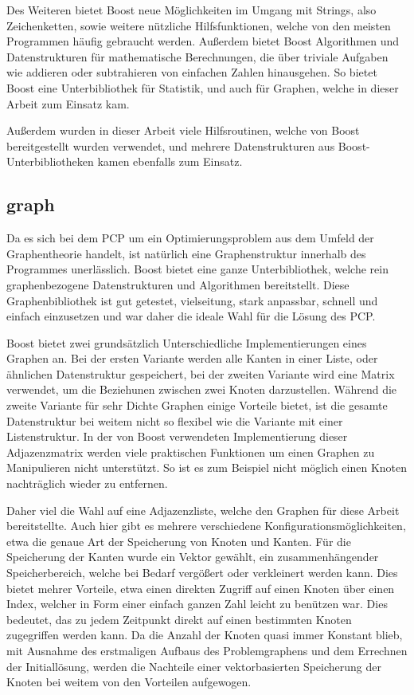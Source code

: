 Des Weiteren bietet Boost neue Möglichkeiten im Umgang mit Strings, also Zeichenketten, sowie weitere nützliche Hilfsfunktionen, welche von den meisten Programmen häufig gebraucht werden. Außerdem bietet
Boost Algorithmen und Datenstrukturen für mathematische Berechnungen, die über triviale Aufgaben wie addieren oder subtrahieren von einfachen Zahlen hinausgehen. So bietet Boost eine Unterbibliothek für 
Statistik, und auch für Graphen, welche in dieser Arbeit zum Einsatz kam.

Außerdem wurden in dieser Arbeit viele Hilfsroutinen, welche von Boost bereitgestellt wurden verwendet, und mehrere Datenstrukturen aus Boost-Unterbibliotheken kamen ebenfalls zum Einsatz.

\subsection{graph}
\label{sec:boost:graph}
Da es sich bei dem PCP um ein Optimierungsproblem aus dem Umfeld der Graphentheorie handelt, ist natürlich eine Graphenstruktur innerhalb des Programmes unerlässlich. Boost bietet eine ganze Unterbibliothek, 
welche rein graphenbezogene Datenstrukturen und Algorithmen bereitstellt. Diese Graphenbibliothek ist gut getestet, vielseitung, stark anpassbar, schnell und einfach einzusetzen und war daher die ideale Wahl
für die Lösung des PCP.

Boost bietet zwei grundsätzlich Unterschiedliche Implementierungen eines Graphen an. Bei der ersten Variante werden alle Kanten in einer Liste, oder ähnlichen Datenstruktur gespeichert, bei
der zweiten Variante wird eine Matrix verwendet, um die Beziehunen zwischen zwei Knoten darzustellen. Während die zweite Variante für sehr Dichte Graphen einige Vorteile bietet, ist die gesamte
Datenstruktur bei weitem nicht so flexibel wie die Variante mit einer Listenstruktur. In der von Boost verwendeten Implementierung dieser Adjazenzmatrix werden viele praktischen Funktionen um einen
Graphen zu Manipulieren nicht unterstützt. So ist es zum Beispiel nicht möglich einen Knoten nachträglich wieder zu entfernen. 

Daher viel die Wahl auf eine Adjazenzliste, welche den Graphen für diese Arbeit bereitstellte. Auch hier gibt es mehrere verschiedene Konfigurationsmöglichkeiten, etwa die genaue Art der Speicherung von
Knoten und Kanten. Für die Speicherung der Kanten wurde ein Vektor gewählt, ein zusammenhängender Speicherbereich, welche bei Bedarf vergößert oder verkleinert werden kann. Dies bietet mehrer Vorteile, etwa
einen direkten Zugriff auf einen Knoten über einen Index, welcher in Form einer einfach ganzen Zahl leicht zu benützen war. Dies bedeutet, das zu jedem Zeitpunkt direkt auf einen bestimmten Knoten zugegriffen
werden kann. Da die Anzahl der Knoten quasi immer Konstant blieb, mit Ausnahme des erstmaligen Aufbaus des Problemgraphens und dem Errechnen der Initiallösung, werden die Nachteile einer vektorbasierten
Speicherung der Knoten bei weitem von den Vorteilen aufgewogen. 

